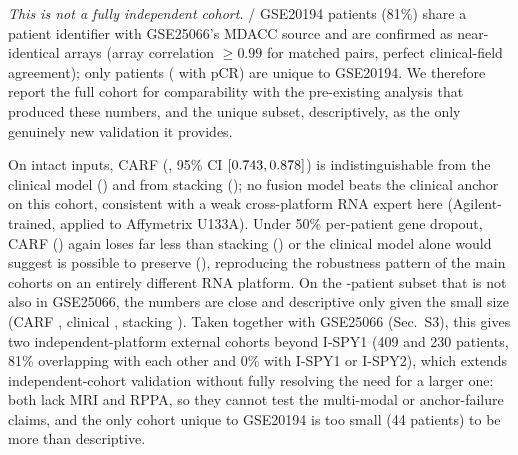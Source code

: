 \documentclass[a4paper,runningheads]{llncs}
\begin{document}
\emph{This is not a fully independent cohort.} \GseTwoZeroOneNineFourOverlapN{}/\GseTwoZeroOneNineFourN{} GSE20194 patients (81\%) share a patient identifier with GSE25066's MDACC source and are confirmed as near-identical arrays (array correlation $\ge 0.99$ for matched pairs, perfect clinical-field agreement); only \GseTwoZeroOneNineFourUniqueN{} patients (\GseTwoZeroOneNineFourUniquePos{} with pCR) are unique to GSE20194. We therefore report the full cohort for comparability with the pre-existing analysis that produced these numbers, and the unique subset, descriptively, as the only genuinely new validation it provides.

\begin{table}[h]
\centering
\caption{GSE20194 (230 patients, 48 pCR; RNA refit on I-SPY2 restricted to shared genes; MRI and RPPA absent), CARF v1.}
\label{tab:gse20194}
\small
{}
\end{table}

On intact inputs, CARF (\GseTwoZeroOneNineFourCarf{}, 95\% CI $[0.743{},0.878{}]$) is indistinguishable from the clinical model (\GseTwoZeroOneNineFourClinical{}) and from stacking (\GseTwoZeroOneNineFourStack{}); no fusion model beats the clinical anchor on this cohort, consistent with a weak cross-platform RNA expert here (Agilent-trained, applied to Affymetrix U133A). Under 50\% per-patient gene dropout, CARF (\GseTwoZeroOneNineFourDropoutCarf{}) again loses far less than stacking (\GseTwoZeroOneNineFourDropoutStack{}) or the clinical model alone would suggest is possible to preserve (\GseTwoZeroOneNineFourDropoutClinical{}), reproducing the robustness pattern of the main cohorts on an entirely different RNA platform. On the \GseTwoZeroOneNineFourUniqueN{}-patient subset that is not also in GSE25066, the numbers are close and descriptive only given the small size (CARF \GseTwoZeroOneNineFourUniqueCarf{}, clinical \GseTwoZeroOneNineFourUniqueClinical{}, stacking \GseTwoZeroOneNineFourUniqueStack{}). Taken together with GSE25066 (Sec.~S3), this gives two independent-platform external cohorts beyond I-SPY1 (409 and 230 patients, 81\% overlapping with each other and 0\% with I-SPY1 or I-SPY2), which extends independent-cohort validation without fully resolving the need for a larger one: both lack MRI and RPPA, so they cannot test the multi-modal or anchor-failure claims, and the only cohort unique to GSE20194 is too small (44 patients) to be more than descriptive.
\end{document}
